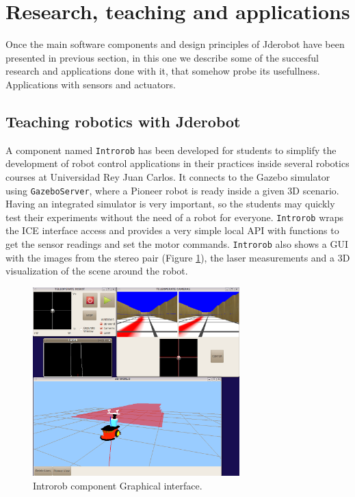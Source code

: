 \documentclass[twocolumn]{svjour3}          %
\begin{document}
\section{Research, teaching and applications}
\label{sec:applications}

Once the main software components and design principles of Jderobot have been presented in previous section, in this one we describe some of the succesful research and applications done with it, that somehow probe its usefullness. Applications with sensors and actuators.

\subsection{Teaching robotics with Jderobot}

A component named \texttt{Introrob} has been developed for students to simplify the development of robot control applications in their practices inside several robotics courses at Universidad Rey Juan Carlos. It connects to the Gazebo simulator using \texttt{GazeboServer}, where a Pioneer robot is ready inside a given 3D scenario. Having an integrated simulator is very important, so the students may quickly test their experiments without the need of a robot for everyone. \texttt{Introrob} wraps the ICE interface access and provides a very simple local API with functions to get the sensor readings and set the motor commands. \texttt{Introrob} also shows a GUI with the images from the stereo pair (Figure \ref{fig:introrob}), the laser measurements and a 3D visualization of the scene around the robot. 

\begin{figure}[h!]
  \includegraphics[width=8cm]{figs/introrob.png}
\caption{Introrob component Graphical interface.}
\label{fig:introrob}
\end{figure}
\end{document}
